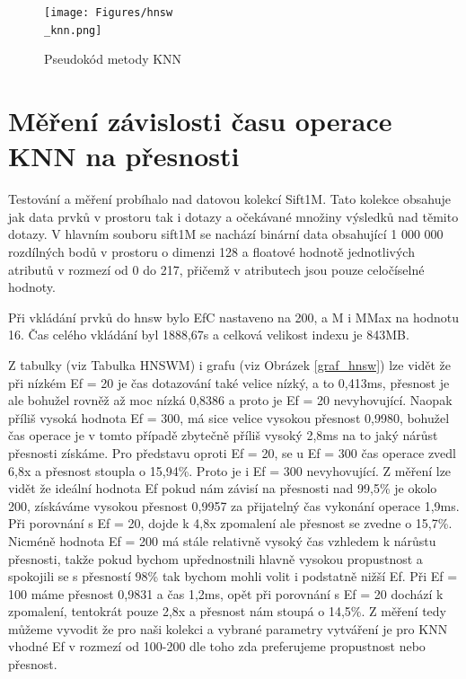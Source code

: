 \documentclass[czech,semestral,dept460,male,csharp,cpdeclaration]{diploma}
\begin{document}
		\begin{figure}
			\centering
			\texttt{[image: Figures/hnsw\\\_knn.png]}
			\caption{Pseudokód metody KNN}
			\label{hnsw_knn}
		\end{figure}
		
		\newpage
		
		\section{Měření závislosti času operace KNN na přesnosti}
		
		Testování a měření probíhalo nad datovou kolekcí Sift1M. Tato kolekce obsahuje jak data prvků v prostoru tak i dotazy a očekávané množiny výsledků nad těmito dotazy. V hlavním souboru sift1M se nachází binární data obsahující 1 000 000 rozdílných bodů v prostoru o dimenzi 128 a floatové hodnotě jednotlivých atributů v rozmezí od 0 do 217, přičemž v atributech jsou pouze celočíselné hodnoty.
		
		Při vkládání prvků do hnsw bylo EfC nastaveno na 200, a M i MMax na hodnotu 16. Čas celého vkládání byl 1888,67s a celková velikost indexu je 843MB.
		
		Z tabulky (viz Tabulka {HNSWM}) i grafu (viz Obrázek \ref{graf_hnsw}) lze vidět že při nízkém Ef = 20 je čas dotazování také velice nízký, a to 0,413ms, přesnost je ale bohužel rovněž až moc nízká 0,8386 a proto je Ef = 20 nevyhovující. Naopak příliš vysoká hodnota Ef = 300, má sice velice vysokou přesnost 0,9980, bohužel čas operace je v tomto případě zbytečně příliš vysoký 2,8ms na to jaký nárůst přesnosti získáme. Pro představu oproti Ef = 20, se u Ef = 300 čas operace zvedl 6,8x a přesnost stoupla o 15,94\%. Proto je i Ef = 300 nevyhovující. Z měření lze vidět že ideální hodnota Ef pokud nám závisí na přesnosti nad 99,5\% je okolo 200, získáváme vysokou přesnost 0,9957 za přijatelný čas vykonání operace 1,9ms. Při porovnání s Ef = 20, dojde k 4,8x zpomalení ale přesnost se zvedne o 15,7\%. Nicméně hodnota Ef = 200 má stále relativně vysoký čas vzhledem k nárůstu přesnosti, takže pokud bychom upřednostnili hlavně vysokou propustnost a spokojili se s přesností 98\% tak bychom mohli volit i podstatně nižší Ef. Při Ef = 100 máme přesnost 0,9831 a čas 1,2ms, opět při porovnání s Ef = 20 dochází k zpomalení, tentokrát pouze 2,8x a přesnost nám stoupá o 14,5\%. Z měření tedy můžeme vyvodit že pro naši kolekci a vybrané parametry vytváření je pro KNN vhodné Ef v rozmezí od 100-200 dle toho zda preferujeme propustnost nebo přesnost.
		
\end{document}
